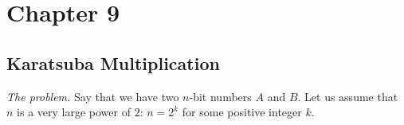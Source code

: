 
\section{Chapter 9}

\subsection{Karatsuba Multiplication} 

%
%
%
%
%
%
%
%
%
%
%
%
%

\noindent \textit{The problem.}
Say that we have two $n$-bit numbers $A$ and $B$.  
Let us assume that $n$ is a very large power of $2$: $n=2^k$ for some positive integer $k$.

